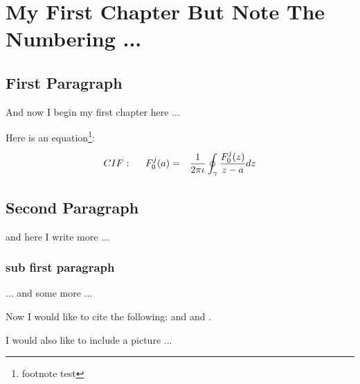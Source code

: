 
\chapter{My First Chapter But Note The Numbering ...}
\graphicspath{{Chapters/Chapter1/Chapter1Figs/PNG/}{Chapters/Chapter1/Chapter1Figs/PDF/}{Chapters/Chapter1/Chapter1Figs/}}

\section{First Paragraph}
And now I begin my first chapter here ...

Here is an equation\footnote{footnote test}:
\begin{eqnarray}
CIF: \hspace*{5mm}F_0^j(a) &=& \frac{1}{2\pi \iota} \oint_{\gamma} \frac{F_0^j(z)}{z - a} dz
\end{eqnarray}


\section{Second Paragraph}
and here I write more ...\cite{texbook}

\subsection{sub first paragraph}
... and some more ...

Now I would like to cite the following: \cite{latex} and \cite{texbook}
and \cite{Rud73}.

I would also like to include a picture ...

